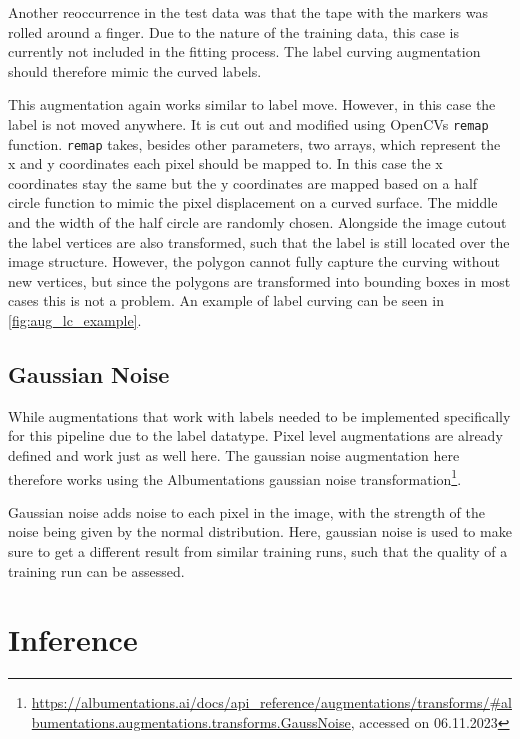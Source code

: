 \documentclass[10pt]{book}
\newcommand{\figureref}[1]{\autoref{#1}}
\begin{document}
Another reoccurrence in the test data was that the tape with the markers was rolled around a finger. Due to the nature of the training data, this case is currently not included in the fitting process. The label curving augmentation should therefore mimic the curved labels.

This augmentation again works similar to label move. However, in this case the label is not moved anywhere. It is cut out and modified using \acp{OpenCV} \texttt{remap} function. \texttt{remap} takes, besides other parameters, two arrays, which represent the x and y coordinates each pixel should be mapped to. In this case the x coordinates stay the same but the y coordinates are mapped based on a half circle function to mimic the pixel displacement on a curved surface. The middle and the width of the half circle are randomly chosen. Alongside the image cutout the label vertices are also transformed, such that the label is still located over the image structure. However, the polygon cannot fully capture the curving without new vertices, but since the polygons are transformed into bounding boxes in most cases this is not a problem. An example of label curving can be seen in \figureref{fig:aug_lc_example}.

\subsection{Gaussian Noise}

While augmentations that work with labels needed to be implemented specifically for this pipeline due to the label datatype. Pixel level augmentations are already defined and work just as well here. The gaussian noise augmentation here therefore works using the Albumentations gaussian noise transformation\footnote{\url{https://albumentations.ai/docs/api\_reference/augmentations/transforms/\#albumentations.augmentations.transforms.GaussNoise}, accessed on 06.11.2023}. 

Gaussian noise adds noise to each pixel in the image, with the strength of the noise being given by the normal distribution. Here, gaussian noise is used to make sure to get a different result from similar training runs, such that the quality of a training run can be assessed.


\section{Inference}
\end{document}
